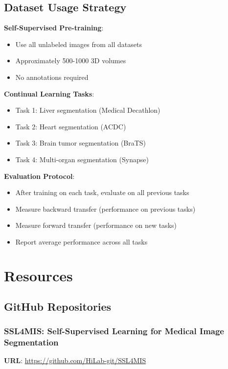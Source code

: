 \documentclass[conference]{IEEEtran}
\begin{document}
\subsection{Dataset Usage Strategy}

\textbf{Self-Supervised Pre-training}:
\begin{itemize}
    \item Use all unlabeled images from all datasets
    \item Approximately 500-1000 3D volumes
    \item No annotations required
\end{itemize}

\textbf{Continual Learning Tasks}:
\begin{itemize}
    \item Task 1: Liver segmentation (Medical Decathlon)
    \item Task 2: Heart segmentation (ACDC)
    \item Task 3: Brain tumor segmentation (BraTS)
    \item Task 4: Multi-organ segmentation (Synapse)
\end{itemize}

\textbf{Evaluation Protocol}:
\begin{itemize}
    \item After training on each task, evaluate on all previous tasks
    \item Measure backward transfer (performance on previous tasks)
    \item Measure forward transfer (performance on new tasks)
    \item Report average performance across all tasks
\end{itemize}

\section{Resources}

\subsection{GitHub Repositories}

\subsubsection{SSL4MIS: Self-Supervised Learning for Medical Image Segmentation}

\textbf{URL}: \url{https://github.com/HiLab-git/SSL4MIS}
\end{document}
